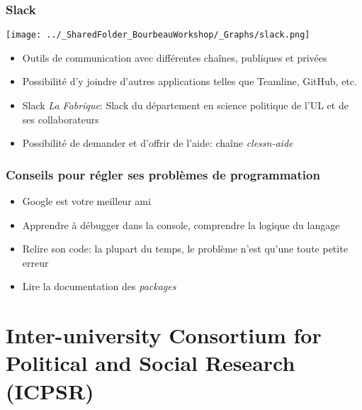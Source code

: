 \documentclass{beamer}
\begin{document}
\begin{frame}

  \frametitle{Slack} \vspace{1cm}
  
    \begin{center}
      
    \texttt{[image: ../\_SharedFolder\_BourbeauWorkshop/\_Graphs/slack.png]}

     \end{center}
      
    \begin{itemize}
     \item Outils de communication avec différentes chaînes, publiques et privées
     \item Possibilité d'y joindre d'autres applications telles que Teamline, GitHub, etc.
     \item Slack \textit{La Fabrique}: Slack du département en science politique de l'UL et de ses collaborateurs
     \item Possibilité de demander et d'offrir de l'aide: chaîne \textit{clessn-aide}
    
        
    \end{itemize}
      
\end{frame}


\begin{frame}

  \frametitle{Conseils pour régler ses problèmes de programmation} \vspace{1cm}

    \begin{itemize}
    
     \item Google est votre meilleur ami
     \item Apprendre à débugger dans la console, comprendre la logique du langage
     \item Relire son code: la plupart du temps, le problème n'est qu'une toute petite erreur
     \item Lire la documentation des \emph{packages}
    
    \end{itemize} 
    
  \end{frame}  
  
  
  \section{Inter-university Consortium for Political and Social Research (ICPSR)}
\end{document}
